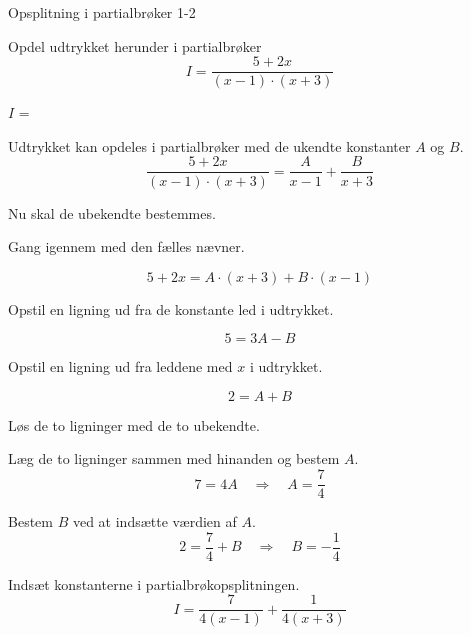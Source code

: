 \documentclass{article}
\begin{document}
\begin{exercise}{Opsplitning i partialbrøker 1-2}

Opdel udtrykket herunder i partialbrøker
\[
I = \frac{5 + 2x}{(x - 1) \cdot (x + 3)}
\]

$I$ = 

\hint
Udtrykket kan opdeles i partialbrøker med de ukendte konstanter $A$ og $B$.
\[
\frac{5 + 2x}{(x - 1) \cdot (x + 3)} =
\frac{A}{x - 1} + \frac{B}{x + 3}
\]

\hint
Nu skal de ubekendte bestemmes.

\hint
Gang igennem med den fælles nævner.

\hint
\[
5 + 2x = A \cdot (x + 3) + B \cdot (x - 1)
\]

\hint
Opstil en ligning ud fra de konstante led i udtrykket.

\hint
\[
5 = 3A - B
\]

\hint
Opstil en ligning ud fra leddene med $x$ i udtrykket.

\hint
\[
2 = A + B
\]

\hint
Løs de to ligninger med de to ubekendte.

\hint
Læg de to ligninger sammen med hinanden og bestem $A$.
\[
7 = 4A \quad \Rightarrow \quad A = \frac{7}{4}
\]

\hint
Bestem $B$ ved at indsætte værdien af $A$.
\[
2 = \frac{7}{4} + B \quad \Rightarrow \quad B = - \frac{1}{4}
\]

\hint
Indsæt konstanterne i partialbrøkopsplitningen.
\[
I = \frac{7}{4(x - 1)} + \frac{1}{4(x + 3)}
\]



\end{exercise}
\end{document}
